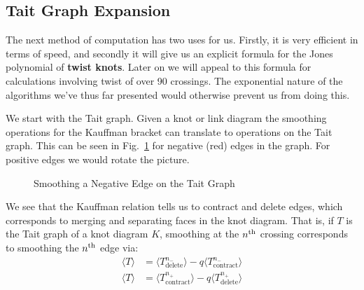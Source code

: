         \subsection{Tait Graph Expansion}
            The next method of computation has two uses for us. Firstly, it is
            very efficient in terms of speed, and secondly it will give us an
            explicit formula for the Jones polynomial of \textbf{twist knots}.
            Later on we will appeal to this formula for calculations
            involving twist of over 90 crossings. The exponential nature of
            the algorithms we've thus far presented would otherwise prevent us
            from doing this.
            \par\hfill\par
            We start with the Tait graph. Given a knot or link diagram
            the smoothing operations for the Kauffman bracket can translate to
            operations on the Tait graph. This can be seen in
            Fig.~\ref{fig:tait_graph_kauffman_negative_smoothing} for negative
            (red) edges in the graph. For positive edges we would rotate the
            picture.
            \par\hfill\par
            \begin{figure}
                \centering
                \caption{Smoothing a Negative Edge on the Tait Graph}
                \label{fig:tait_graph_kauffman_negative_smoothing}
            \end{figure}
            We see that the Kauffman relation tells us to contract and delete
            edges, which corresponds to merging and separating faces in the
            knot diagram. That is, if $T$ is the Tait graph of a knot diagram
            $K$, smoothing at the $n^{\small\textrm{th}}$ crossing corresponds
            to smoothing the $n^{\small\textrm{th}}$ edge via:
            \begin{align}
                \label{eqns:kauffman_tait_relation}
                \langle{T}\rangle
                &=\langle{{T^{n_{-}}_{\textrm{delete}}}}\rangle
                -q\langle{{T^{n_{-}}_{\textrm{contract}}}}\rangle\\
                \langle{T}\rangle
                &=\langle{{T^{n_{+}}_{\textrm{contract}}}}\rangle
                -q\langle{{T^{n_{+}}_{\textrm{delete}}}}\rangle
            \end{align}
